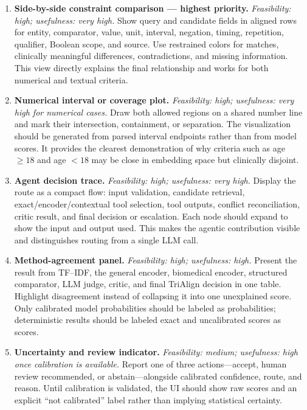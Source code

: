 \documentclass[10pt]{article}
\begin{document}
\begin{enumerate}
\item \textbf{Side-by-side constraint comparison --- highest priority.} \emph{Feasibility: high; usefulness: very high.} Show query and candidate fields in aligned rows for entity, comparator, value, unit, interval, negation, timing, repetition, qualifier, Boolean scope, and source. Use restrained colors for matches, clinically meaningful differences, contradictions, and missing information. This view directly explains the final relationship and works for both numerical and textual criteria.

\item \textbf{Numerical interval or coverage plot.} \emph{Feasibility: high; usefulness: very high for numerical cases.} Draw both allowed regions on a shared number line and mark their intersection, containment, or separation. The visualization should be generated from parsed interval endpoints rather than from model scores. It provides the clearest demonstration of why criteria such as age $\geq18$ and age $<18$ may be close in embedding space but clinically disjoint.

\item \textbf{Agent decision trace.} \emph{Feasibility: high; usefulness: very high.} Display the route as a compact flow: input validation, candidate retrieval, exact/encoder/contextual tool selection, tool outputs, conflict reconciliation, critic result, and final decision or escalation. Each node should expand to show the input and output used. This makes the agentic contribution visible and distinguishes routing from a single LLM call.

\item \textbf{Method-agreement panel.} \emph{Feasibility: high; usefulness: high.} Present the result from TF--IDF, the general encoder, biomedical encoder, structured comparator, LLM judge, critic, and final TriAlign decision in one table. Highlight disagreement instead of collapsing it into one unexplained score. Only calibrated model probabilities should be labeled as probabilities; deterministic results should be labeled exact and uncalibrated scores as scores.

\item \textbf{Uncertainty and review indicator.} \emph{Feasibility: medium; usefulness: high once calibration is available.} Report one of three actions---accept, human review recommended, or abstain---alongside calibrated confidence, route, and reason. Until calibration is validated, the UI should show raw scores and an explicit ``not calibrated'' label rather than implying statistical certainty.


\end{enumerate}
\end{document}
